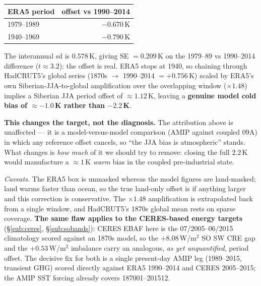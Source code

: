\documentclass[10pt]{article}
\begin{document}
\begin{center}
\begin{tabular}{lr}
\toprule
ERA5 period & offset vs 1990--2014 \\
\midrule
1979--1989 & $\mathbf{-0.670}$\,K \\
1940--1969 & $\mathbf{-0.790}$\,K \\
\bottomrule
\end{tabular}
\end{center}

\noindent The interannual sd is $0.578$\,K, giving SE $=0.209$\,K on the 1979--89 vs 1990--2014 difference
($t\approx3.2$): the offset is real. ERA5 stops at 1940, so chaining through HadCRUT5's global series
(1870s $\to$ 1990--2014 $= +0.756$\,K) scaled by ERA5's own Siberian-JJA-to-global amplification over the
overlapping window ($\times1.48$) implies a Siberian JJA period offset of $\approx1.12$\,K, leaving a
\textbf{genuine model cold bias of $\approx-1.0$\,K rather than $-2.2$\,K}.

\textbf{This changes the target, not the diagnosis.} The attribution above is unaffected --- it is a
model-versus-model comparison (AMIP against coupled 09A) in which any reference offset cancels, so ``the JJA
bias is atmospheric'' stands. What changes is \emph{how much} of it we should try to remove: closing the full
$2.2$\,K would manufacture a $\approx1$\,K \emph{warm} bias in the coupled pre-industrial state.

\emph{Caveats.} The ERA5 box is unmasked whereas the model figures are land-masked; land warms faster than
ocean, so the true land-only offset is if anything larger and this correction is conservative. The $\times1.48$
amplification is extrapolated back from a single window, and HadCRUT5's 1870s global mean rests on sparse
coverage. \textbf{The same flaw applies to the CERES-based energy targets} (\S\ref{sub:ceres},
\S\ref{sub:sobands}): CERES EBAF here is the 07/2005--06/2015 climatology scored against an 1870s model, so
the $+8.08$\,W/m$^2$ SO SW CRE gap and the $+0.53$\,W/m$^2$ imbalance carry an analogous, \emph{as yet
unquantified}, period offset. The decisive fix for both is a single present-day AMIP leg (1989--2015,
transient GHG) scored directly against ERA5 1990--2014 and CERES 2005--2015; the AMIP SST forcing already
covers 187001--201512.
\end{document}
